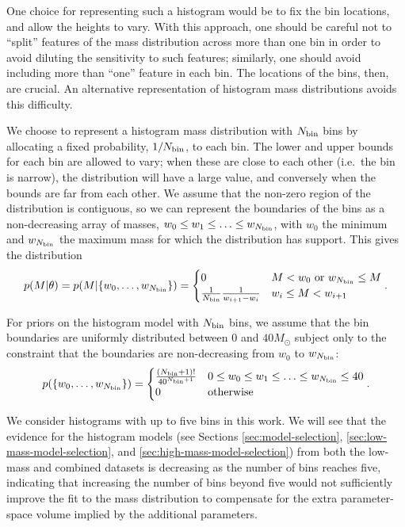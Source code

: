 \documentclass[preprint]{aastex}
\newcommand{\Msun}{M_\odot}
\newcommand{\Nbin}{N_{\textnormal{bin}}}
\begin{document}
One choice for representing such a histogram would be to fix the bin
locations, and allow the heights to vary.  With this approach, one
should be careful not to ``split'' features of the mass distribution
across more than one bin in order to avoid diluting the sensitivity to
such features; similarly, one should avoid including more than ``one''
feature in each bin.  The locations of the bins, then, are crucial.
An alternative representation of histogram mass distributions avoids
this difficulty.

We choose to represent a histogram mass distribution with $\Nbin$ bins
by allocating a fixed probability, $1/\Nbin$, to each bin.  The lower
and upper bounds for each bin are allowed to vary; when these are
close to each other (i.e.\ the bin is narrow), the distribution will
have a large value, and conversely when the bounds are far from each
other.  We assume that the non-zero region of the distribution is
contiguous, so we can represent the boundaries of the bins as a
non-decreasing array of masses, $w_0 \leq w_1 \leq \ldots \leq
w_{\Nbin}$, with $w_0$ the minimum and $w_{\Nbin}$ the maximum mass
for which the distribution has support.  This gives the distribution
\begin{equation}
  \label{eq:hist-def}
  p(M|\theta) = p(M|\{w_0, \ldots, w_{\Nbin}\}) = 
  \begin{cases}
    0 & M < w_0 \textnormal{ or } w_{\Nbin} \leq M \\
    \frac{1}{\Nbin} \frac{1}{w_{i+1} - w_i} & w_i \leq M < w_{i+1}
  \end{cases}.
\end{equation}

For priors on the histogram model with $\Nbin$ bins, we assume that
the bin boundaries are uniformly distributed between 0 and $40 \Msun$
subject only to the constraint that the boundaries are non-decreasing
from $w_0$ to $w_{\Nbin}$:
\begin{equation}
  p(\{w_0, \ldots, w_{\Nbin}\}) = 
  \begin{cases}
    \frac{\left(\Nbin+1\right)!}{40^{\Nbin+1}} & 0 \leq w_0 \leq w_1
    \leq \ldots \leq w_{\Nbin} \leq 40 \\
    0 & \textnormal{otherwise}
  \end{cases}.
\end{equation}

We consider histograms with up to five bins in this work.  We will see
that the evidence for the histogram models (see Sections
\ref{sec:model-selection}, \ref{sec:low-mass-model-selection}, and
\ref{sec:high-mass-model-selection}) from both the low-mass and
combined datasets is decreasing as the number of bins reaches five,
indicating that increasing the number of bins beyond five would not
sufficiently improve the fit to the mass distribution to compensate
for the extra parameter-space volume implied by the additional
parameters.
\end{document}
